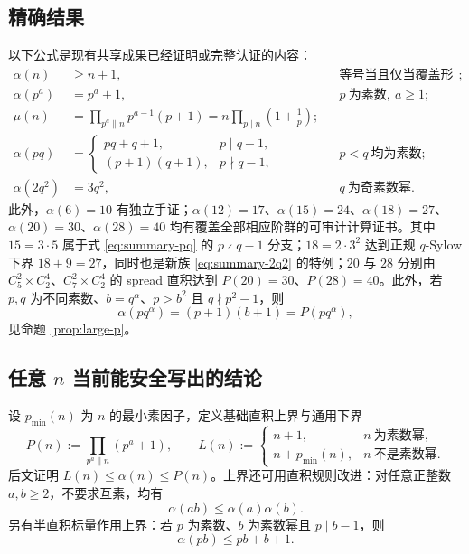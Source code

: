 \documentclass[11pt,a4paper]{article}
\numberwithin{equation}{section}
\theoremstyle{plain}
\theoremstyle{definition}
\theoremstyle{remark}
\begin{document}
\subsection{精确结果}
以下公式是现有共享成果已经证明或完整认证的内容：
\begin{align}
 \alpha(n)&\ge n+1,&&\text{等号当且仅当覆盖形成等阶子群划分};
 \label{eq:summary-lower}\\
 \alpha(p^a)&=p^a+1,&&p\ \text{为素数},\ a\ge1;
 \label{eq:summary-primepower}\\
 \mu(n)&=\prod_{p^a\parallel n}p^{a-1}(p+1)
       =n\prod_{p\mid n}\left(1+\frac1p\right);
 \label{eq:summary-fixed}\\
 \alpha(pq)&=\begin{cases}
   pq+q+1,&p\mid q-1,\\[2pt]
   (p+1)(q+1),&p\nmid q-1,
 \end{cases}
 &&p<q\ \text{均为素数};
 \label{eq:summary-pq}\\
 \alpha(2q^2)&=3q^2,&&q\ \text{为奇素数幂}.
 \label{eq:summary-2q2}
\end{align}
此外，$\alpha(6)=10$ 有独立手证；$\alpha(12)=17$、$\alpha(15)=24$、$\alpha(18)=27$、$\alpha(20)=30$、$\alpha(28)=40$ 均有覆盖全部相应阶群的可审计计算证书。其中 $15=3\cdot5$ 属于式 \eqref{eq:summary-pq} 的 $p\nmid q-1$ 分支；$18=2\cdot3^2$ 达到正规 $q$-Sylow 下界 $18+9=27$，同时也是新族 \eqref{eq:summary-2q2} 的特例；$20$ 与 $28$ 分别由 $C_5^2\times C_2^4$、$C_7^2\times C_2^4$ 的 spread 直积达到 $P(20)=30$、$P(28)=40$。此外，若 $p,q$ 为不同素数、$b=q^\alpha$、$p>b^2$ 且 $q\nmid p^2-1$，则
\begin{equation}\label{eq:summary-large-p}
 \alpha(pq^\alpha)=(p+1)(b+1)=P(pq^\alpha),
\end{equation}
见命题 \ref{prop:large-p}。

\subsection{任意 \texorpdfstring{$n$}{n} 当前能安全写出的结论}\label{sec:general-enclosure}
设 $p_{\min}(n)$ 为 $n$ 的最小素因子，定义基础直积上界与通用下界
\begin{equation}\label{eq:LP-definition}
 P(n):=\prod_{p^a\parallel n}(p^a+1),\qquad
 L(n):=\begin{cases}
 n+1,&n\ \text{为素数幂},\\
 n+p_{\min}(n),&n\ \text{不是素数幂}.
 \end{cases}
\end{equation}
后文证明 $L(n)\le\alpha(n)\le P(n)$。上界还可用直积规则改进：对任意正整数 $a,b\ge2$，不要求互素，均有
\begin{equation}\label{eq:summary-product}
 \alpha(ab)\le\alpha(a)\alpha(b).
\end{equation}
另有半直积标量作用上界：若 $p$ 为素数、$b$ 为素数幂且 $p\mid b-1$，则
\begin{equation}\label{eq:summary-semidirect}
 \alpha(pb)\le pb+b+1.
\end{equation}
\end{document}

